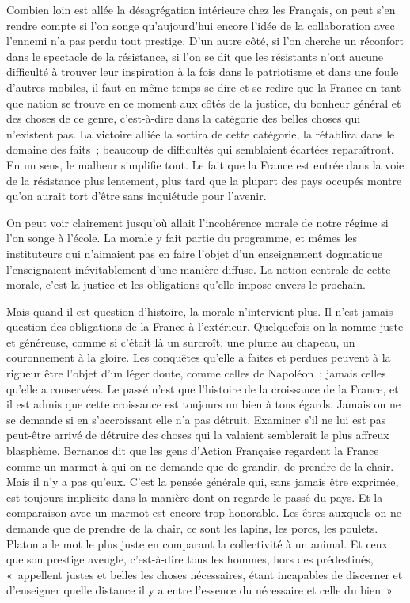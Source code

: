 \documentclass[french,twoside]{book} %
\begin{document}
Combien loin est allée la désagrégation intérieure chez les Français, on peut s'en rendre compte si l'on songe qu'aujourd'hui encore l'idée de la collaboration avec l'ennemi n'a pas perdu tout prestige. D'un autre côté, si l'on cherche un réconfort dans le spectacle de la résistance, si l'on se dit que les résistants n'ont aucune difficulté à trouver leur inspiration à la fois dans le patriotisme et dans une foule d'autres mobiles, il faut en même temps se dire et se redire que la France en tant que nation se trouve en ce moment aux côtés de la justice, du bonheur général et des choses de ce genre, c'est-à-dire dans la catégorie des belles choses qui n'existent pas. La victoire alliée la sortira de cette catégorie, la rétablira dans le domaine des faits ; beaucoup de difficultés qui semblaient écartées reparaîtront. En un sens, le malheur simplifie tout. Le fait que la France est entrée dans la voie de la résistance plus lentement, plus tard que la plupart des pays occupés montre qu'on aurait tort d'être sans inquiétude pour l'avenir.\par
On peut voir clairement jusqu'où allait l'incohérence morale de notre régime si l'on songe à l'école. La morale y fait partie du programme, et mêmes les instituteurs qui n'aimaient pas en faire l'objet d'un enseignement dogmatique l'enseignaient inévitablement d'une manière diffuse. La notion centrale de cette morale, c'est la justice et les obligations qu'elle impose envers le prochain.\par
Mais quand il est question d'histoire, la morale n'intervient plus. Il n'est jamais question des obligations de la France à l'extérieur. Quelquefois on la nomme juste et généreuse, comme si c'était là un surcroît, une plume au chapeau, un couronnement à la gloire. Les conquêtes qu'elle a faites et perdues peuvent à la rigueur être l'objet d'un léger doute, comme celles de Napoléon ; jamais celles qu'elle a conservées. Le passé n'est que l'histoire de la croissance de la France, et il est admis que cette croissance est toujours un bien à tous égards. Jamais on ne se demande si en s'accroissant elle n'a pas détruit. Examiner s'il ne lui est pas peut-être arrivé de détruire des choses qui la valaient semblerait le plus affreux blasphème. Bernanos dit que les gens d'Action Française regardent la France comme un marmot à qui on ne demande que de grandir, de prendre de la chair. Mais il n'y a pas qu'eux. C'est la pensée générale qui, sans jamais être exprimée, est toujours implicite dans la manière dont on regarde le passé du pays. Et la comparaison avec un marmot est encore trop honorable. Les êtres auxquels on ne demande que de prendre de la chair, ce sont les lapins, les porcs, les poulets. Platon a le mot le plus juste en comparant la collectivité à un animal. Et ceux que son prestige aveugle, c'est-à-dire tous les hommes, hors des prédestinés, « appellent justes et belles les choses nécessaires, étant incapables de discerner et d'enseigner quelle distance il y a entre l'essence du nécessaire et celle du bien ».\par
\end{document}
